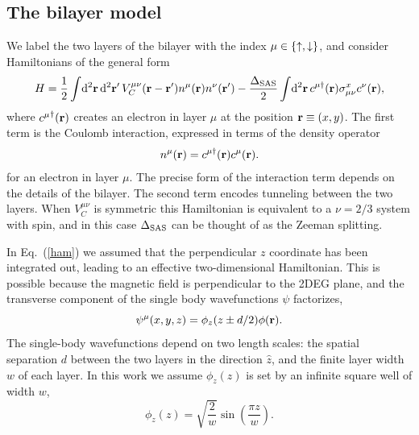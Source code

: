 \subsection{The bilayer model}
We label the two layers of the bilayer with the index $\mu \in \{\uparrow,\downarrow\}$, and consider  Hamiltonians of the general form
\begin{equation}
	H=\frac{1}{2} \int\! \mathrm{d}^2{\mathbf{r}}\, \mathrm{d}^2{\mathbf{r}}^\prime\, V_C^{\mu\nu}({\mathbf{r}}-{\mathbf{r}}^\prime) n^{\mu}({\mathbf{r}})n^{\nu}({\mathbf{r}}^\prime) 
	- \frac{\Delta_\textrm{SAS}}{2} \int\! \mathrm{d}^2{\mathbf{r}}\, c^{\mu\dagger}({\mathbf{r}}) \sigma^x_{\mu \nu} c^{\nu}({\mathbf{r}}), 
	\label{ham}
\end{equation}
where ${c^{\mu}}^\dagger ({\mathbf{r}})$ creates an electron in layer $\mu$ at the position ${\mathbf{r}}\equiv(x,y)$. The first term is the Coulomb interaction, expressed in terms of the density operator 
\begin{eqnarray}\label{density}
	n^{\mu}({\mathbf{r}})=c^{\mu\dagger} ({\mathbf{r}}) c^{\mu}({\mathbf{r}}).
\end{eqnarray}
for an electron in layer $\mu$. The precise form of the interaction term depends on the details of the bilayer. The second term encodes tunneling between the two layers.
When $V_C^{\mu\nu}$ is  symmetric this Hamiltonian is equivalent to a $\nu=2/3$ system with spin, and in this case $\Delta_\textrm{SAS}$ can be thought of as the Zeeman splitting.


In Eq.~(\ref{ham}) we assumed that the perpendicular $z$ coordinate has been integrated out, leading to an effective two-dimensional Hamiltonian.
This is possible because the magnetic field is perpendicular to the 2DEG plane, and the transverse component of the single body wavefunctions $\psi$ factorizes,
\begin{equation}
\psi^\mu(x,y,z)=\phi_z(z \pm d / 2)  \phi({\mathbf{r}}).
\end{equation}
The single-body wavefunctions depend on two length scales: the spatial separation $d$ between the two layers in the direction $\hat{z}$, and the finite layer width $w$ of each layer. In this work we assume $\phi_z(z)$ is set by an infinite square well of width $w$, 
\begin{equation}
\phi_z(z)=\sqrt{\frac{2}{w}} \sin\left(\frac{\pi z}{w}\right). 
\end{equation}
 
